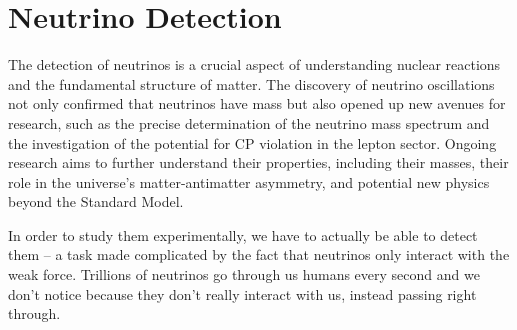 \section{Neutrino Detection}

The detection of neutrinos is a crucial aspect of understanding nuclear reactions and the fundamental structure of matter.
The discovery of neutrino oscillations not only confirmed that neutrinos have mass but also opened up new avenues for research, such as the precise determination of the neutrino mass spectrum and the investigation of the potential for CP violation in the lepton sector.
Ongoing research aims to further understand their properties, including their masses, their role in the universe's matter-antimatter asymmetry, and potential new physics beyond the Standard Model.

In order to study them experimentally, we have to actually be able to detect them -- a task made complicated by the fact that neutrinos only interact with the weak force.
Trillions of neutrinos go through us humans every second and we don't notice because they don't really interact with us, instead passing right through.






